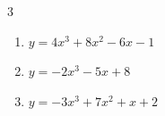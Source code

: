 \begin{multicols}{3}
\begin{enumerate}

  \item $y=4x^{3}+8x^{2}-6x-1$


  \item $y=-2x^{3}-5x+8$


  \item $y=-3x^{3}+7x^{2}+x+2$


\end{enumerate}
\end{multicols}

\newpage
\resetdrill


